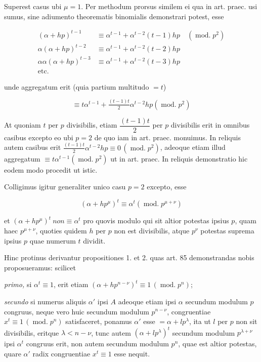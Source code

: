 
Superest casus ubi $\mu=1$. Per methodum prorsus similem ei qua in art. praec. usi sumus, sine adiumento theorematis binomialis demonstrari potest, esse

\[\begin{aligned}
(\alpha+hp)^{t-1}&\equiv\alpha^{t-1}+\alpha^{t-2}(t-1)hp\quad(\operatorname{mod.}p^2)\\
\alpha(\alpha+hp)^{t-2}&\equiv\alpha^{t-1}+\alpha^{t-2}(t-2)hp\\
\alpha\alpha(\alpha+hp)^{t-3}&\equiv\alpha^{t-1}+\alpha^{t-2}(t-3)hp\\
\text{etc.}\quad&
\end{aligned}\]

\noindent unde aggregatum erit (quia partium multitudo $=t$)

\[\equiv t\alpha^{t-1}+\tfrac{(t-1)t}{2}\alpha^{t-2}hp(\operatorname{mod.}p^2)\]

At quoniam $t$ per $p$ divisibilis, etiam $\dfrac{(t-1)t}{2}$ per $p$ divisibilis erit in omnibus casibus excepto eo ubi $p=2$ de quo iam in art. praec. monuimus. In reliquis autem casibus erit $\tfrac{(t-1)t}{2}\alpha^{t-2}hp\equiv0\,(\operatorname{mod.}p^2)$, adeoque etiam illud aggregatum $\equiv t\alpha^{t-1}(\operatorname{mod.}p^2)$ ut in art. praec. In reliquis demonstratio hic eodem modo procedit ut istic.

Colligimus igitur generaliter unico casu $p=2$ excepto, esse

\[(\alpha+hp^{\mu})^t\equiv\alpha^t(\operatorname{mod.}p^{\mu+\nu})\]

\noindent et $(\alpha+hp^{\mu})^t\ \textit{non}\equiv\alpha^t$ pro quovis modulo qui sit altior potestas ipsius $p$, quam haec $p^{\mu+\nu}$, quoties quidem $h$ per $p$ non est divisibilis, atque $p^{\nu}$ potestas suprema ipsius $p$ quae numerum $t$ dividit.

Hinc protinus derivantur propositiones 1. et 2. quas art. 85 demonstrandas nobis proposueramus: scilicet

\emph{primo,} si $\alpha^t\equiv1$, erit etiam $(\alpha+hp^{n-\nu})^t\equiv1\,(\operatorname{mod.}p^n)$;

\emph{secundo} si numerus aliquis $\alpha'$ ipsi $A$ adeoque etiam ipsi $\alpha$ secundum modulum $p$ congruus, neque vero huic secundum modulum $p^{n-\nu}$, congruentiae $x^t\equiv1\,(\operatorname{mod.}p^n)$ satisfaceret, ponamus $\alpha'$ esse $=\alpha+lp^{\lambda}$, ita ut $l$ per $p$ non sit divisibilis, eritque $\lambda<n-\nu$, tunc autem $(\alpha+lp^{\lambda})^t$ secundum modulum $p^{\lambda+\nu}$ ipsi $\alpha^t$ congruus erit, non autem secundum modulum $p^n$, quae est altior potestas, quare $\alpha'$ radix congruentiae $x^t\equiv1$ esse nequit.

